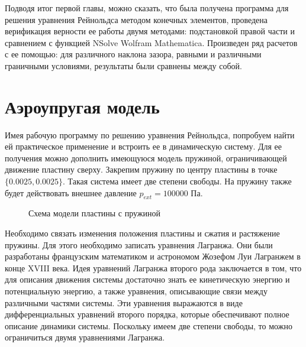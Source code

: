 \documentclass[a4paper,14pt]{extarticle}
\begin{document}
Подводя итог первой главы, можно сказать, что была получена программа для решения уравнения Рейнольдса методом конечных элементов, проведена верификация верности ее работы двумя методами: подстановкой правой части и сравнением с функцией NSolve Wolfram Mathematica. Произведен ряд расчетов с ее помощью: для различного наклона зазора, равными и различными граничными условиями, результаты были сравнены между собой.

\newpage

\section{Аэроупругая модель}
Имея рабочую программу по решению уравнения Рейнольдса, попробуем найти ей практическое применение и встроить ее в динамическую систему. Для ее получения можно дополнить имеющуюся модель пружиной, ограничивающей движение пластину сверху. Закрепим пружину по центру пластины в точке $\{0.0025, 0.0025\}$. Такая система имеет две степени свободы. На пружину также будет действовать внешнее давление $p_{ext} = 100000$ Па.

\begin{figure}[!htbp]
	\caption{Схема модели пластины с пружиной}
	\label{pruzina}
\end{figure}


Необходимо связать изменения положения пластины и сжатия и растяжение пружины. Для этого необходимо записать уравнения Лагранжа. Они были разработаны французским математиком и астрономом Жозефом Луи Лагранжем в конце XVIII века. Идея уравнений Лагранжа второго рода заключается в том, что для описания движения системы достаточно знать ее кинетическую энергию и потенциальную энергию, а также уравнения, описывающие связи между различными частями системы. Эти уравнения выражаются в виде дифференциальных уравнений второго порядка, которые обеспечивают полное описание динамики системы. Поскольку имеем две степени свободы, то можно ограничиться двумя уравнениями Лагранжа.
\end{document}
